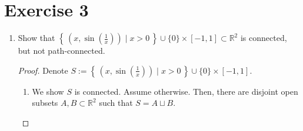 \documentclass[a4paper]{article}
\newcommand{\makeset}[2]{\left\{\, #1 \mid #2 \,\right\}}
\begin{document}
    \section*{Exercise 3}
    \begin{enumerate}
        \item Show that \(\makeset{(x, \sin(\frac{1}{x}))}{x > 0} \cup \{0\} \times [-1, 1] \subset \mathbb{R}^2\) is connected, but not path-connected.
        \begin{proof}
            Denote \(S := \makeset{(x, \sin(\frac{1}{x}))}{x > 0} \cup \{0\} \times [-1, 1]\).
            \begin{enumerate}
                \item We show \(S\) is connected. Assume otherwise. Then, there are disjoint open subsets \(A, B \subset \mathbb{R}^2\) such that \(S = A \sqcup B\).
            \end{enumerate}
        \end{proof}
    \end{enumerate}
\end{document}
